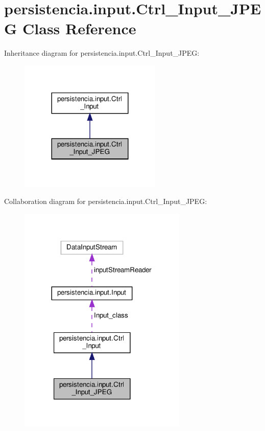 \hypertarget{classpersistencia_1_1input_1_1Ctrl__Input__JPEG}{}\section{persistencia.\+input.\+Ctrl\+\_\+\+Input\+\_\+\+J\+P\+EG Class Reference}
\label{classpersistencia_1_1input_1_1Ctrl__Input__JPEG}


Inheritance diagram for persistencia.\+input.\+Ctrl\+\_\+\+Input\+\_\+\+J\+P\+EG\+:\nopagebreak
\begin{figure}[H]
\begin{center}
\leavevmode
\includegraphics[width=192pt]{classpersistencia_1_1input_1_1Ctrl__Input__JPEG__inherit__graph}
\end{center}
\end{figure}


Collaboration diagram for persistencia.\+input.\+Ctrl\+\_\+\+Input\+\_\+\+J\+P\+EG\+:\nopagebreak
\begin{figure}[H]
\begin{center}
\leavevmode
\includegraphics[width=227pt]{classpersistencia_1_1input_1_1Ctrl__Input__JPEG__coll__graph}
\end{center}
\end{figure}
